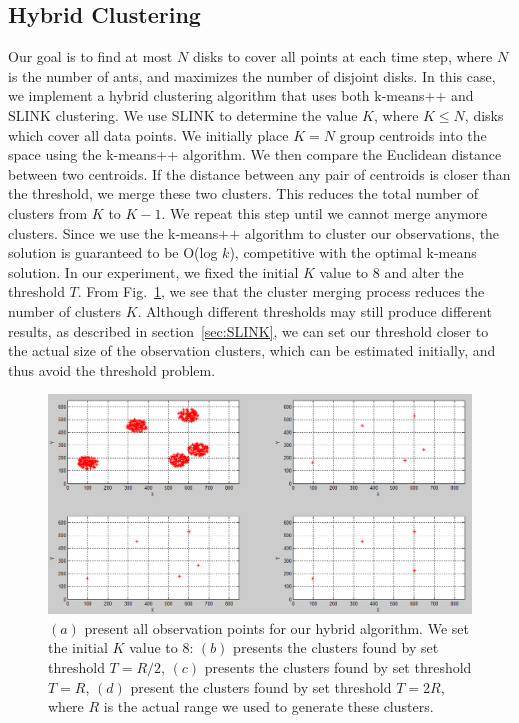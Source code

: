 \documentclass[12pt]{article}
\begin{document}
\subsection{Hybrid Clustering}
Our goal is to find at most $N$ disks to cover all points at each time step, where $N$ is the number of ants, and maximizes the number of disjoint disks. In this case, we implement a hybrid clustering algorithm that uses both k-means++ and SLINK clustering. We use SLINK to determine the value $K$, where $K \leq N$, disks which cover all data points. We initially place $K=N$ group centroids into the space using the k-means++ algorithm. We then compare the Euclidean distance between two centroids. If the distance between any pair of centroids is closer than the threshold, we merge these two clusters. This reduces the total number of clusters from $K$ to $K-1$. We repeat this step until we cannot merge anymore clusters. Since we use the k-means++ algorithm to cluster our observations, the solution is guaranteed to be O(log $k$), competitive with the optimal k-means solution. In our experiment, we fixed the initial $K$ value to 8 and alter the threshold $T$. From Fig.~\ref{fig:bothCluster}, we see that the cluster merging process reduces the number of clusters $K$. Although different thresholds may still produce different results, as described in section~\ref{sec:SLINK}, we can set our threshold closer to the actual size of the observation clusters, which can be estimated initially, and thus avoid the threshold problem.

\begin{figure}[h!]
\centering
\includegraphics[width=5.5in]{GDataPlot12.png}
\caption{$(a)$ present all observation points for our hybrid algorithm. We set the initial $K$ value to 8: $(b)$ presents the clusters found by set threshold $T=R/2$, $(c)$ presents the clusters found by set threshold $T=R$, $(d)$ present the clusters found by set threshold $T=2R$, where $R$ is the actual range we used to generate these clusters.}
\label{fig:bothCluster}
\end{figure}
\end{document}
